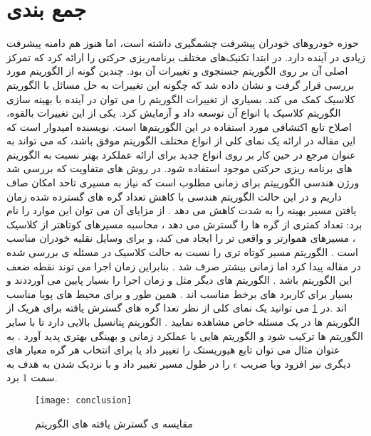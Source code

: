 

\section{جمع بندی}

حوزه خودروهای خودران پیشرفت چشمگیری داشته است، اما هنوز هم دامنه پیشرفت زیادی در آینده دارد. 
\cite{paliwal2023survey}
در ابتدا تکنیک‌های مختلف برنامه‌ریزی حرکتی را ارائه کرد که تمرکز اصلی آن بر روی الگوریتم جستجوی
  و تغییرات آن بود. چندین گونه از الگوریتم   مورد بررسی قرار گرفت و نشان داده شد که چگونه این تغییرات به حل مسائل با الگوریتم کلاسیک  کمک می کند. بسیاری از تغییرات الگوریتم   را می توان در آینده با بهینه سازی الگوریتم کلاسیک یا انواع آن توسعه داد و آزمایش کرد. یکی از این تغییرات بالقوه، اصلاح تابع اکتشافی مورد استفاده در این الگوریتم‌ها است. نویسنده امیدوار است که این مقاله در ارائه یک نمای کلی از انواع مختلف الگوریتم   موفق باشد، که می تواند به عنوان مرجع در حین کار بر روی انواع جدید برای ارائه عملکرد بهتر نسبت به الگوریتم های برنامه ریزی حرکتی موجود استفاده شود.
در روش های متفاویت که بررسی شد ورژن هندسی الگورییتم 
برای زمانی مطلوب است که نیاز به مسیری تاحد امکان صاف داریم و در این حالت الگوریتم هندسی با کاهش تعداد گره های گسترده شده زمان یافتن مسیر بهینه را به شدت کاهش می دهد . از مزایای آن می توان این موارد را نام برد:
تعداد کمتری از گره ها را گسترش می دهد ،
محاسبه مسیرهای کوتاهتر از کلاسیک ،
مسیرهای هموارتر و واقعی تر را ایجاد می کند، 
و برای وسایل نقلیه خودران مناسب است .
الگوریتم 
مسیر کوتاه تری را نسبت به حالت کلاسیک در مسئله ی بررسی شده در مقاله پیدا کرد اما زمانی بیشتر صرف شد . بنابراین زمان اجرا می توند نقطه ضعف این الگوریتم باشد .
الگوریتم های دیگر مثل 
و
زمان اجرا را بسیار پایین می آورددند و بسیار برای کاربرد های برخط مناسب اند .
همین طور 
و
برای محیط های پویا مناسب اند .در 
\ref{conclusion}
 می توانید یک نمای کلی از نظر تعدا گره های گسترش یافته برای هریک از الگوریتم ها در یک مسئله خاص مشاهده نمایید .
 الگوریتم 
 پتانسیل بالایی دارد تا با سایر الگوریتم ها ترکیب شود و الگوریتم هایی با عملکرد زمانی و بهینگی بهتری پدید آورد . به عتوان مثال می توان تابع هیوریستک را تغییر داد یا برای انتخاب هر گره معیار های دیگری نیز افزود ویا ضریب 
 $\epsilon$
 را در طول مسیر تغییر داد و با نزدیک شدن به هدف به سمت 1 برد. 
\begin{figure}[h]
	\texttt{[image: conclusion]}
	\centering
	\caption{مقایسه ی گسترش یافته های الگوریتم }
	\cite{paliwal2023survey}
	\label{conclusion}
\end{figure}
\